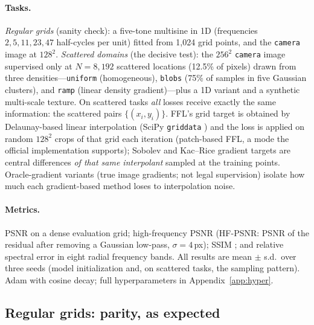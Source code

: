 \documentclass[10pt]{article}
\begin{document}
\paragraph{Tasks.} \emph{Regular grids} (sanity check): a five-tone multisine in 1D
(frequencies $2,5,11,23,47$ half-cycles per unit) fitted from 1{,}024 grid points, and
the \texttt{camera} image at $128^2$. \emph{Scattered domains} (the decisive test): the
$256^2$ \texttt{camera} image supervised only at $N{=}8{,}192$ scattered locations
(12.5\% of pixels) drawn from three densities---\texttt{uniform} (homogeneous),
\texttt{blobs} (75\% of samples in five Gaussian clusters), and \texttt{ramp} (linear
density gradient)---plus a 1D variant and a synthetic multi-scale texture. On scattered
tasks \emph{all} losses receive exactly the same information: the scattered pairs
$\{(x_i,y_i)\}$. FFL's grid target is obtained by Delaunay-based linear interpolation
(SciPy \texttt{griddata} \citep{virtanen2020scipy}) and the loss is applied on random
$128^2$ crops of that grid each iteration (patch-based FFL, a mode the official
implementation supports); Sobolev and Kac--Rice gradient targets are central differences
\emph{of that same interpolant} sampled at the training points. Oracle-gradient variants
(true image gradients; not legal supervision) isolate how much each gradient-based
method loses to interpolation noise.

\paragraph{Metrics.} PSNR on a dense evaluation grid; high-frequency PSNR (HF-PSNR:
PSNR of the residual after removing a Gaussian low-pass, $\sigma=4$\,px); SSIM
\citep{wang2004ssim}; and relative spectral error in eight radial frequency bands.
All results are mean $\pm$ s.d.\ over three seeds (model initialization and, on
scattered tasks, the sampling pattern). Adam \citep{kingma2015adam} with cosine decay;
full hyperparameters in Appendix~\ref{app:hyper}.

\subsection{Regular grids: parity, as expected}
\label{sec:exp1}

\begin{table}[t]
\centering
\caption{\textbf{Regular-grid fitting} (sanity check; mean $\pm$ s.d.\ over 3 seeds).
1D: parity across all losses. 2D: dense supervision needs no auxiliary drive---MSE-only
is best among PE-MLP losses, and architecture fixes (SIREN, FINER) dominate the entire
loss family on-grid.}
\label{tab:exp1}

\end{table}
\end{document}
